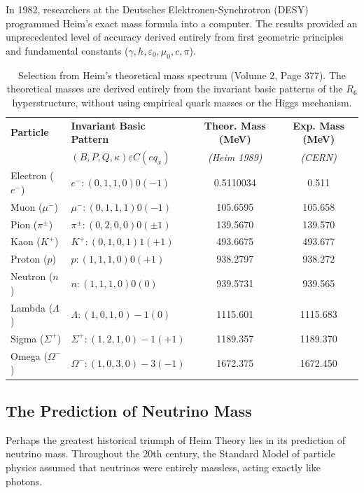 \documentclass[11pt,a4paper,oneside]{article}
\begin{document}
In 1982, researchers at the Deutsches Elektronen-Synchrotron (DESY) programmed Heim's exact mass formula into a computer. The results provided an unprecedented level of accuracy derived entirely from first geometric principles and fundamental constants ($\gamma, h, \varepsilon_0, \mu_0, c, \pi$).

\begin{table}[htbp]
\centering
\renewcommand{\arraystretch}{1.3}
\begin{tabular}{@{}llcc@{}}
\toprule
\textbf{Particle} & \textbf{Invariant Basic Pattern} & \textbf{Theor. Mass (MeV)} & \textbf{Exp. Mass (MeV)} \\
& $(B, P, Q, \kappa)\varepsilon C(eq_x)$ & \textit{(Heim 1989)} & \textit{(CERN)} \\
\midrule
\rowcolor{theoryblue!5}
Electron ($e^-$) & $e^-: (0,1,1,0)0(-1)$ & 0.5110034 & 0.511 \\
Muon ($\mu^-$) & $\mu^-: (0,1,1,1)0(-1)$ & 105.6595 & 105.658 \\
\rowcolor{theoryblue!5}
Pion ($\pi^\pm$) & $\pi^\pm: (0,2,0,0)0(\pm 1)$ & 139.5670 & 139.570 \\
Kaon ($K^+$) & $K^+: (0,1,0,1)1(+1)$ & 493.6675 & 493.677 \\
\rowcolor{theorygray!20}
Proton ($p$) & $p: (1,1,1,0)0(+1)$ & 938.2797 & 938.272 \\
\rowcolor{theorygray!20}
Neutron ($n$) & $n: (1,1,1,0)0(0)$ & 939.5731 & 939.565 \\
Lambda ($\Lambda$) & $\Lambda: (1,0,1,0)-1(0)$ & 1115.601 & 1115.683 \\
Sigma ($\Sigma^+$) & $\Sigma^+: (1,2,1,0)-1(+1)$ & 1189.357 & 1189.370 \\
Omega ($\Omega^-$) & $\Omega^-: (1,0,3,0)-3(-1)$ & 1672.375 & 1672.450 \\
\bottomrule
\end{tabular}
\caption{Selection from Heim's theoretical mass spectrum (Volume 2, Page 377). The theoretical masses are derived entirely from the invariant basic patterns of the $R_6$ hyperstructure, without using empirical quark masses or the Higgs mechanism.}
\end{table}

\subsection{The Prediction of Neutrino Mass}
Perhaps the greatest historical triumph of Heim Theory lies in its prediction of neutrino mass. Throughout the 20th century, the Standard Model of particle physics assumed that neutrinos were entirely massless, acting exactly like photons. 
\end{document}
